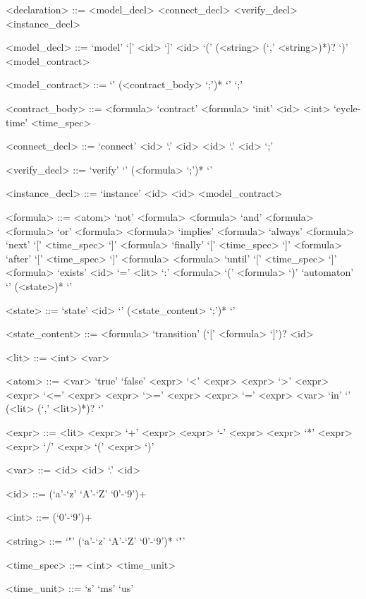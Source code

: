 \begin{grammar}
  <declaration> ::= <model\_decl>
  \alt <connect\_decl>
  \alt <verify\_decl>
  \alt <instance\_decl>

  <model\_decl> ::= `model' `[' <id> `]' <id> `(' (<string> (`,' <string>)*)? `)' <model\_contract>

  <model\_contract> ::= `{' (<contract\_body> `;')* `}'
  \alt `;'

  <contract\_body> ::= <formula>
  \alt `contract' <formula>
  \alt `init' <id> <int>
  \alt `cycle-time' <time\_spec>

  <connect\_decl> ::= `connect' <id> `.' <id> <id> `.' <id> `;'

  <verify\_decl> ::= `verify' `{' (<formula> `;')* `}'

  <instance\_decl> ::= `instance' <id> <id> <model\_contract>

  <formula> ::= <atom>
  \alt `not' <formula>
  \alt <formula> `and' <formula>
  \alt <formula> `or' <formula>
  \alt <formula> `implies' <formula>
  \alt `always' <formula>
  \alt `next' `[' <time\_spec> `]' <formula>
  \alt `finally' `[' <time\_spec> `]' <formula>
  \alt `after' `[' <time\_spec> `]' <formula>
  \alt <formula> `until' `[' <time\_spec> `]' <formula>
  \alt `exists' <id> `=' <lit> `:' <formula>
  \alt `(' <formula> `)'
  \alt `automaton' `{' (<state>)* `}'
  
  <state> ::= `state' <id> `{' (<state\_content> `;')* `}'

  <state\_content> ::= <formula>
  \alt `transition' (`[' <formula> `]')? <id>

  <lit> ::= <int>
  \alt <var>

  <atom> ::= <var>
  \alt `true'
  \alt `false'
  \alt <expr> `<' <expr>
  \alt <expr> `>' <expr>
  \alt <expr> `<=' <expr>
  \alt <expr> `>=' <expr>
  \alt <expr> `=' <expr>
  \alt <var> `in' `{' (<lit> (`,' <lit>)*)? `}'

  <expr> ::= <lit>
  \alt <expr> `+' <expr>
  \alt <expr> `-' <expr>
  \alt <expr> `*' <expr>
  \alt <expr> `/' <expr>
  \alt `(' <expr> `)'

  <var> ::= <id>
  \alt <id> `.' <id>
  
  <id> ::= (`a'-`z' `A'-`Z' `0'-`9')+
  
  <int> ::= (`0'-`9')+

  <string> ::= `"' (`a'-`z' `A'-`Z' `0'-`9')* `"'

  <time\_spec> ::= <int> <time\_unit>
  
  <time\_unit> ::= `s'
  \alt `ms'
  \alt `us'
\end{grammar}

